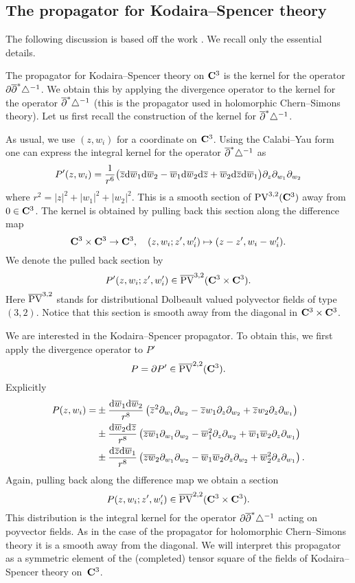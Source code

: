 \documentclass[../main.tex]{subfiles}
\begin{document}
\subsection{The propagator for Kodaira--Spencer theory}

The following discussion is based off the work \cite{CLbcov1}. 
We recall only the essential details. 

The propagator for Kodaira--Spencer theory on $\mathbf{C}^3$ is the kernel for the operator $\partial \overline{\partial}^* \triangle^{-1}$. 
We obtain this by applying the divergence operator to the kernel for the operator $\overline{\partial}^* \triangle^{-1}$ (this is the propagator used in holomorphic Chern--Simons theory). 
Let us first recall the construction of the kernel for $\overline{\partial}^* \triangle^{-1}$.

As usual, we use $(z,w_i)$ for a coordinate on $\mathbf{C}^3$. 
Using the Calabi--Yau form one can express the integral kernel for the operator $\overline{\partial}^* \triangle^{-1}$ as
\[
P'(z,w_i) = \frac{1}{r^6} \big({\overline{z}} \mathrm{d} \overline{w}_1 \mathrm{d} \overline{w}_2 - \overline{w}_1 \mathrm{d} \overline{w}_2 \mathrm{d} {\overline{z}} + \overline{w}_2 \mathrm{d} {\overline{z}} \mathrm{d} \overline{w}_1 \big) \partial_z \partial_{w_1} \partial_{w_2}  
\]
where $r^2 = |z|^2 + |w_1|^2 + |w_2|^2$. 
This is a smooth section of ${\rm PV}^{3,2}(\mathbf{C}^3)$ away from $0 \in \mathbf{C}^3$.
The kernel is obtained by pulling back this section along the difference map 
\[
\mathbf{C}^3 \times \mathbf{C}^3 \to \mathbf{C}^3,\quad (z, w_i ; z',w_i') \mapsto (z-z', w_i - w_i') .
\]
We denote the pulled back section by
\[
P'(z,w_i ; z',w_i') \in \overline{{\rm PV}}^{3,2}(\mathbf{C}^3 \times \mathbf{C}^3) . 
\]
Here $\overline{{\rm PV}}^{3,2}$ stands for distributional Dolbeault valued polyvector fields of type $(3,2)$.
Notice that this section is smooth away from the diagonal in $\mathbf{C}^3 \times \mathbf{C}^3$. 

We are interested in the Kodaira--Spencer propagator. 
To obtain this, we first apply the divergence operator to $P'$ 
\[
P = \partial P' \in \overline{{\rm PV}}^{2,2}(\mathbf{C}^3) .
\]
Explicitly
\begin{align*}
P(z,w_i) = & \pm \frac{\mathrm{d} \overline{w}_1 \mathrm{d} \overline{w}_2}{r^8} \left({\overline{z}}^2 \partial_{w_1} \partial_{w_2} - {\overline{z}} w_1 \partial_z \partial_{w_2} + {\overline{z}} w_2 \partial_z \partial_{w_1} \right) \\ 
& \pm \frac{\mathrm{d} \overline{w}_2 \mathrm{d} {\overline{z}}}{r^8} \left({\overline{z}} \overline{w}_1 \partial_{w_1} \partial_{w_2} - \overline{w}_1^2 \partial_z \partial_{w_2} + \overline{w}_1 \overline{w}_2 \partial_z \partial_{w_1}\right) \\
& \pm \frac{\mathrm{d} {\overline{z}} \mathrm{d} \overline{w}_1}{r^8} \left({\overline{z}} \overline{w}_2 \partial_{w_1} \partial_{w_2} - \overline{w}_1 \overline{w}_2 \partial_z \partial_{w_2} + \overline{w}_2^2 \partial_z \partial_{w_1} \right) .
\end{align*}
Again, pulling back along the difference map we obtain a section
\[
P(z,w_i;z',w_i') \in \overline{{\rm PV}}^{2,2}(\mathbf{C}^3 \times \mathbf{C}^3) .
\]
This distribution is the integral kernel for the operator $\partial \overline{\partial}^* \triangle^{-1}$ acting on poyvector fields. 
As in the case of the propagator for holomorphic Chern--Simons theory it is a smooth away from the diagonal. 
We will interpret this propagator as a symmetric element of the (completed) tensor square of the fields of Kodaira--Spencer theory on~$\mathbf{C}^3$. 
\end{document}
